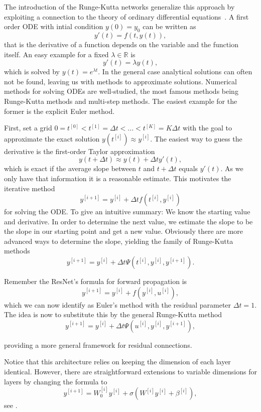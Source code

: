 \documentclass{article}
\begin{document}
The introduction of the Runge-Kutta networks generalize this approach by exploiting a connection to the theory of ordinary differential equations~\citep{benning2019}. A first order ODE with intial condition $y(0) = y_0$ can be written as 
$$
y'(t) = f(t, y(t)),
$$
that is the derivative of a function depends on the variable and the function itself. An easy example for a fixed $\lambda \in \mathbb{R}$ is 
$$
y'(t) = \lambda y(t),
$$
which is solved by $y(t) = e^{\lambda t}$. In the general case analytical solutions can often not be found, leaving us with methods to approximate solutions. Numerical methods for solving ODEs are well-studied, the most famous methods being Runge-Kutta methods and multi-step methods. The easiest example for the former is the explicit Euler method. 

First, set a grid $0 = t^{[0]} < t^{[1]} = \Delta t < ... < t^{[K]} = K \Delta t $ with the goal to approximate the exact solution $y(t^{[i]}) \approx y^{[i]}$. The easiest way to guess the derivative is the first-order Taylor approximation
$$
y(t + \Delta t) \approx y(t) + \Delta t y'(t),
$$
which is exact if the average slope between $t$ and $t + \Delta t$ equals $y'(t)$. As we only have that information it is a reasonable estimate. This motivates the iterative method
$$
y^{[i+1]} = y^{[i]} + \Delta t f(t^{[i]}, y^{[i]})
$$
for solving the ODE. To give an intuitive summary: We know the starting value and derivative. In order to determine the next value, we estimate the slope to be the slope in our starting point and get a new value. Obviously there are more advanced ways to determine the slope, yielding the family of Runge-Kutta methods
$$
y^{[i+1]} = y^{[i]} + \Delta t \Psi(t^{[i]}, y^{[i]}, y^{[i+1]}).
$$

Remember the ResNet's formula for forward propagation is 
$$
y^{[i+1]} = y^{[i]} + f(y^{[i]}, u^{[i]}),
$$
which we can now identify as Euler's method with the residual parameter $\Delta t = 1$. The idea is now to substitute this by the general Runge-Kutta method
$$
y^{[i+1]} = y^{[i]} + \Delta t \Psi(u^{[i]}, y^{[i]}, y^{[i+1]}),
$$

providing a more general framework for residual connections.

Notice that this architecture relies on keeping the dimension of each layer identical. However, there are straightforward extensions to variable dimensions for layers by changing the formula to
$$
y^{[i+1]} = W_{0}^{[i]} y^{[i]} + \sigma(W^{[i]} y^{[i]} + \beta^{[i]}),
$$
see \citep{he2016}.
\end{document}
